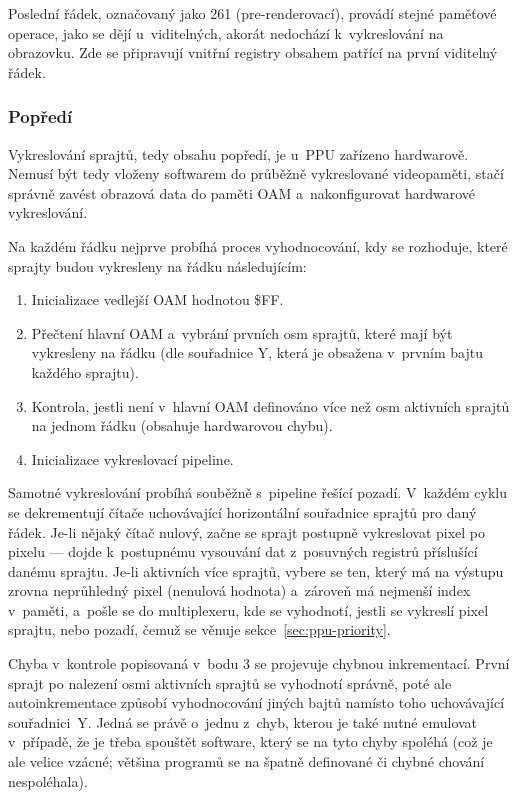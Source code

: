 Poslední řádek, označovaný jako 261 (pre-renderovací), provádí stejné paměťové operace, jako se dějí u~viditelných, akorát nedochází k~vykreslování na obrazovku. Zde se připravují vnitřní registry obsahem patřící na první viditelný řádek.

\subsubsection{Popředí}
Vykreslování sprajtů, tedy obsahu popředí, je u~PPU zařízeno hardwarově. Nemusí být tedy vloženy softwarem do průběžně vykreslované videopaměti, stačí správně zavést obrazová data do paměti OAM a~nakonfigurovat hardwarové vykreslování.

Na každém řádku nejprve probíhá proces vyhodnocování, kdy se rozhoduje, které sprajty budou vykresleny na řádku následujícím:
\begin{enumerate}
	\item Inicializace vedlejší OAM hodnotou \$FF.
	\item Přečtení hlavní OAM a~vybrání prvních osm sprajtů, které mají být vykresleny na řádku (dle souřadnice Y, která je obsažena v~prvním bajtu každého sprajtu).
	\item Kontrola, jestli není v~hlavní OAM definováno více než osm aktivních sprajtů na jednom řádku (obsahuje hardwarovou chybu).
	\item Inicializace vykreslovací pipeline.
\end{enumerate}

Samotné vykreslování probíhá souběžně s~pipeline řešící pozadí. V~každém cyklu se dekrementují čítače uchovávající horizontální souřadnice sprajtů pro daný řádek. Je-li nějaký čítač nulový, začne se sprajt postupně vykreslovat pixel po pixelu --- dojde k~postupnému vysouvání dat z~posuvných registrů příslušící danému sprajtu. Je-li aktivních více sprajtů, vybere se ten, který má na výstupu zrovna neprůhledný pixel (nenulová hodnota) a~zároveň má nejmenší index v~paměti, a~pošle se do multiplexeru, kde se vyhodnotí, jestli se vykreslí pixel sprajtu, nebo pozadí, čemuž se věnuje sekce~\ref{sec:ppu-priority}.

\begin{note}
Chyba v~kontrole popisovaná v~bodu 3 se projevuje chybnou inkrementací. První sprajt po nalezení osmi aktivních sprajtů se vyhodnotí správně, poté ale autoinkrementace způsobí vyhodnocování jiných bajtů namísto toho uchovávající souřadnici~Y. Jedná se právě o~jednu z~chyb, kterou je také nutné emulovat v~případě, že je třeba spouštět software, který se na tyto chyby spoléhá (což je ale velice vzácné; většina programů se na špatně definované či chybné chování nespoléhala).
\end{note}


